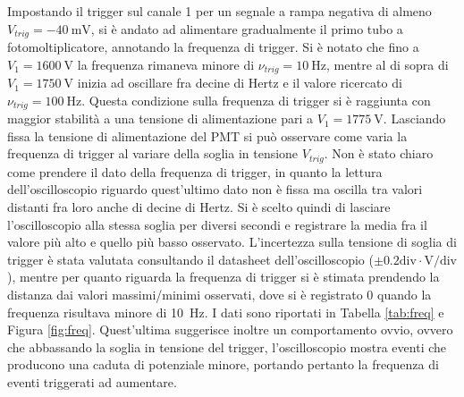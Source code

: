 \documentclass[10pt,a4paper]{article}
\begin{document}
Impostando il trigger sul canale 1 per un segnale a rampa negativa di almeno $V_{trig}=\SI{-40}{\milli \volt}$, si è andato ad alimentare gradualmente il primo tubo a fotomoltiplicatore, annotando la frequenza di trigger. Si è notato che fino a $V_1=\SI{1600}{\volt}$ la frequenza rimaneva minore di  $\nu_{trig}=\SI{10}{\hertz}$, mentre al di sopra di $V_1=\SI{1750}{\volt}$ inizia ad oscillare fra decine di Hertz e il valore ricercato di $\nu_{trig}=\SI{100}{\hertz}$. Questa condizione sulla frequenza di trigger si è raggiunta con maggior stabilità a una tensione di alimentazione pari a $V_1=\SI{1775}{\volt}$. 
    Lasciando fissa la tensione di alimentazione del PMT si può osservare come varia la frequenza di trigger al variare della soglia in tensione $V_{trig}$. Non è stato chiaro come prendere il dato della frequenza di trigger, in quanto la lettura dell'oscilloscopio riguardo quest'ultimo dato non è fissa ma oscilla tra valori distanti fra loro anche di decine di Hertz. Si è scelto quindi di lasciare l'oscilloscopio alla stessa soglia per diversi secondi e registrare la media fra il valore più alto e quello più basso osservato. L'incertezza sulla tensione di soglia di trigger è stata valutata consultando il datasheet dell'oscilloscopio ($\pm0.2 \text{div} \cdot \text{V}/\text{div}$), mentre per quanto riguarda la frequenza di trigger si è stimata prendendo la distanza dai valori massimi/minimi osservati, dove si è registrato 0 quando la frequenza risultava minore di \SI{10}{\hertz}. I dati sono riportati in Tabella \ref{tab:freq} e Figura \ref{fig:freq}. Quest'ultima suggerisce inoltre un comportamento ovvio, ovvero che abbassando la soglia in tensione del trigger, l'oscilloscopio mostra eventi che producono una caduta di potenziale minore, portando pertanto la frequenza di eventi triggerati ad aumentare.
\end{document}
